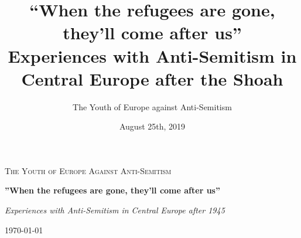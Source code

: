 \documentclass{book}
\title{``When the refugees are gone, they'll come after us''\\ Experiences with Anti-Semitism in Central Europe after the Shoah}
\author{The Youth of Europe against Anti-Semitism}
\date{August 25th, 2019}
\begin{document}
	\setlength{\parindent}{0pt}
	\setlength{\parskip}{1em}
\begin{titlepage}
	\centering
	{\scshape\LARGE The Youth of Europe
	Against Anti-Semitism \par}
	\vspace{1cm}
	{\huge\bfseries''When the refugees are gone, they'll come after us'' \par}
	\vspace{2cm}
	{\Large\itshape Experiences with Anti-Semitism in Central Europe after 1945\par}
	\vfill
	{\large\today\par}
\end{titlepage}
\thispagestyle{empty}
\tableofcontents













 







\nocite{*}
\printbibliography
\end{document}
